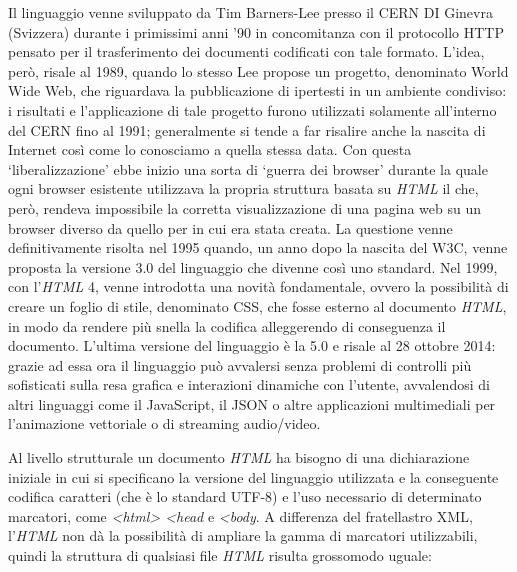 {Il linguaggio venne sviluppato da Tim Barners-Lee presso il CERN DI
Ginevra (Svizzera) durante i primissimi anni '90 in concomitanza con il
protocollo HTTP pensato per il trasferimento dei documenti codificati
con tale formato. L'idea, però, risale al 1989, quando lo stesso Lee
propose un progetto, denominato World Wide Web, che riguardava la
pubblicazione di ipertesti in un ambiente condiviso: i risultati e
l'applicazione di tale progetto furono utilizzati solamente all'interno
del CERN fino al 1991; generalmente si tende a far risalire anche la
nascita di Internet così come lo conosciamo a quella stessa data. Con
questa `liberalizzazione' ebbe inizio una sorta di `guerra dei browser'
durante la quale ogni browser esistente utilizzava la propria struttura
basata su \emph{HTML} il che, però, rendeva impossibile la corretta
visualizzazione di una pagina web su un browser diverso da quello per in
cui era stata creata. La questione venne definitivamente risolta nel
1995 quando, un anno dopo la nascita del W3C, venne proposta la versione
3.0 del linguaggio che divenne così uno standard. Nel 1999, con
l'\emph{HTML} 4, venne introdotta una novità fondamentale, ovvero la
possibilità di creare un foglio di stile, denominato CSS, che fosse
esterno al documento \emph{HTML}, in modo da rendere più snella la
codifica alleggerendo di conseguenza il documento. L'ultima versione del
linguaggio è la 5.0 e risale al 28 ottobre 2014: grazie ad essa ora il
linguaggio può avvalersi senza problemi di controlli più sofisticati
sulla resa grafica e interazioni dinamiche con l'utente, avvalendosi di
altri linguaggi come il JavaScript, il JSON o altre applicazioni
multimediali per l'animazione vettoriale o di streaming audio/video.

Al livello strutturale un documento \emph{HTML} ha bisogno di una
dichiarazione iniziale in cui si specificano la versione del linguaggio
utilizzata e la conseguente codifica caratteri (che è lo standard UTF-8)
e l'uso necessario di determinato marcatori, come
\emph{\textless{}html\textgreater{} \textless{}head} e
\emph{\textless{}body}. A differenza del fratellastro XML,
l'\emph{HTML} non dà la possibilità di ampliare la gamma di marcatori
utilizzabili, quindi la struttura di qualsiasi file \emph{HTML} risulta
grossomodo uguale:

}
